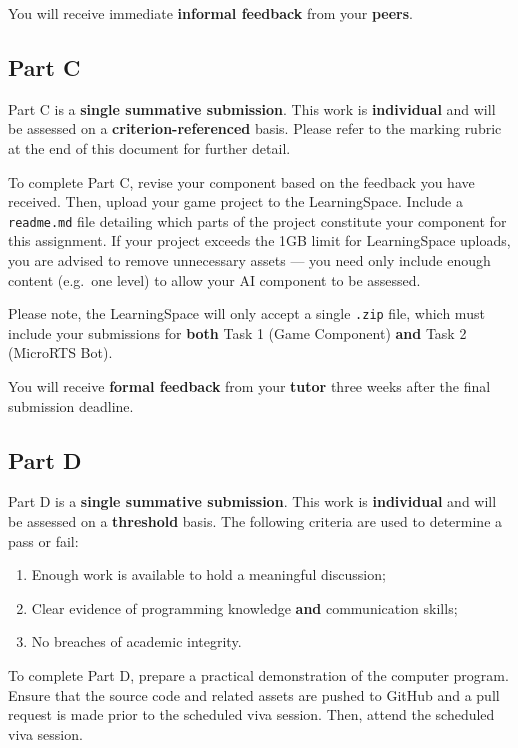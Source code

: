 You will receive immediate \textbf{informal feedback} from your \textbf{peers}.

\subsection*{Part C}

Part C is a \textbf{single summative submission}. This work is \textbf{individual} and will be assessed on a \textbf{criterion-referenced} basis. Please refer to the marking rubric at the end of this document for further detail.

To complete Part C, revise your component based on the feedback you have received. Then, upload your game project to the LearningSpace.
Include a \texttt{readme.md} file detailing which parts of the project constitute your component for this assignment.
If your project exceeds the 1GB limit for LearningSpace uploads, you are advised to remove unnecessary assets ---
you need only include enough content (e.g.\ one level) to allow your AI component to be assessed.

Please note, the LearningSpace will only accept a single \texttt{.zip} file, which must include your submissions for
\textbf{both} Task 1 (Game Component) \textbf{and} Task 2 (MicroRTS Bot).

You will receive \textbf{formal feedback} from your \textbf{tutor} three weeks after the final submission deadline.

\subsection*{Part D}

Part D is a \textbf{single summative submission}. This work is \textbf{individual} and will be assessed on a \textbf{threshold} basis.  The following criteria are used to determine a pass or fail:

\begin{enumerate}[label=(\alph*)]
	\item Enough work is available to hold a meaningful discussion;
	\item Clear evidence of programming knowledge \textbf{and} communication skills;
	\item No breaches of academic integrity.
\end{enumerate}

To complete Part D, prepare a practical demonstration of the computer program. Ensure that the source code and related assets are pushed to GitHub and a pull request is made prior to the scheduled viva session. Then, attend the scheduled viva session.

